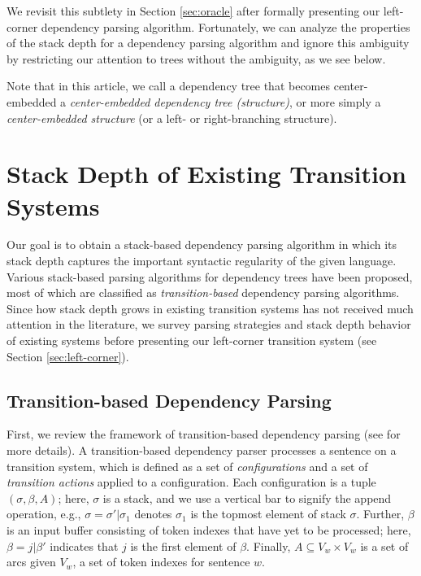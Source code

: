 \documentclass[english]{jnlp_1.4}
\begin{document}
We revisit this subtlety in Section \ref{sec:oracle} after formally presenting our left-corner dependency parsing algorithm.
Fortunately, we can analyze the properties of the stack depth for a dependency parsing algorithm and ignore this ambiguity by restricting our attention to trees without the ambiguity, as we see below.

Note that in this article, we call a dependency tree that becomes center-embedded a {\it center-embedded dependency tree (structure)}, or more simply a {\it center-embedded structure} (or a left- or right-branching structure).


\section{Stack Depth of Existing Transition Systems}
\label{sec:others}

Our goal is to obtain a stack-based dependency parsing algorithm in which its stack depth captures the important syntactic regularity of the given language.
Various stack-based parsing algorithms for dependency trees have been proposed, most of which are classified as {\it transition-based} dependency parsing algorithms.
Since how stack depth grows in existing transition systems has not received much attention in the literature, we survey parsing strategies and stack depth behavior of existing systems before presenting our left-corner transition system (see Section \ref{sec:left-corner}).


\subsection{Transition-based Dependency Parsing}
\label{sec:trans-based}

First, we review the framework of transition-based dependency parsing (see  for more details).
A transition-based dependency parser processes a sentence on a transition system, which is defined as a set of {\it configurations} and a set of {\it transition actions} applied to a configuration.
Each configuration is a tuple $(\sigma,\beta,A)$;
here, $\sigma$ is a stack, and we use a vertical bar to signify the append operation, e.g., $\sigma=\sigma'|\sigma_1$ denotes $\sigma_1$ is the topmost element of stack $\sigma$.
Further, $\beta$ is an input buffer consisting of token indexes that have yet to be processed;
here, $\beta=j|\beta'$ indicates that $j$ is the first element of $\beta$.
Finally, $A \subseteq V_w \times V_w$ is a set of arcs given $V_w$, a set of token indexes for sentence $w$.
\end{document}
